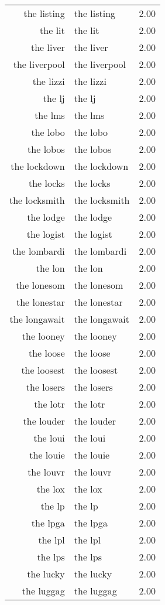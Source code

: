 \begin{table}[ht]
\begin{tabular}{rlr}
  the listing & the listing & 2.00 \\ 
  the lit & the lit & 2.00 \\ 
  the liver & the liver & 2.00 \\ 
  the liverpool & the liverpool & 2.00 \\ 
  the lizzi & the lizzi & 2.00 \\ 
  the lj & the lj & 2.00 \\ 
  the lms & the lms & 2.00 \\ 
  the lobo & the lobo & 2.00 \\ 
  the lobos & the lobos & 2.00 \\ 
  the lockdown & the lockdown & 2.00 \\ 
  the locks & the locks & 2.00 \\ 
  the locksmith & the locksmith & 2.00 \\ 
  the lodge & the lodge & 2.00 \\ 
  the logist & the logist & 2.00 \\ 
  the lombardi & the lombardi & 2.00 \\ 
  the lon & the lon & 2.00 \\ 
  the lonesom & the lonesom & 2.00 \\ 
  the lonestar & the lonestar & 2.00 \\ 
  the longawait & the longawait & 2.00 \\ 
  the looney & the looney & 2.00 \\ 
  the loose & the loose & 2.00 \\ 
  the loosest & the loosest & 2.00 \\ 
  the losers & the losers & 2.00 \\ 
  the lotr & the lotr & 2.00 \\ 
  the louder & the louder & 2.00 \\ 
  the loui & the loui & 2.00 \\ 
  the louie & the louie & 2.00 \\ 
  the louvr & the louvr & 2.00 \\ 
  the lox & the lox & 2.00 \\ 
  the lp & the lp & 2.00 \\ 
  the lpga & the lpga & 2.00 \\ 
  the lpl & the lpl & 2.00 \\ 
  the lps & the lps & 2.00 \\ 
  the lucky & the lucky & 2.00 \\ 
  the luggag & the luggag & 2.00 \\ 

\end{tabular}
\end{table}
